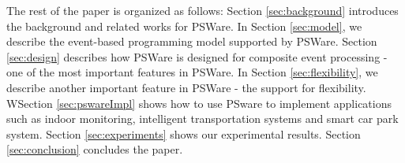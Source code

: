 The rest of the paper is organized as follows: Section \ref{sec:background} introduces the background and related works for PSWare. In Section \ref{sec:model}, we describe the event-based programming model supported by PSWare. Section \ref{sec:design} describes how PSWare is designed for composite event processing - one of the most important features in PSWare. In Section \ref{sec:flexibility}, we describe another important feature in PSWare - the support for flexibility. WSection \ref{sec:pswareImpl} shows how to use PSware to implement applications such as indoor monitoring, intelligent transportation systems and smart car park system. Section \ref{sec:experiments} shows our experimental results. Section \ref{sec:conclusion} concludes the paper.